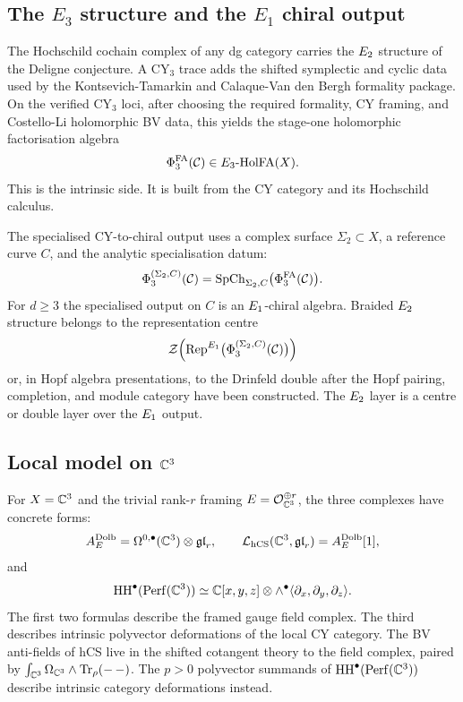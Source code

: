\subsection*{The \(E_3\) structure and the \(E_1\) chiral output}

The Hochschild cochain complex of any dg category carries the
\(E_2\) structure of the Deligne conjecture. A CY$_3$ trace adds the
shifted symplectic and cyclic data used by the Kontsevich-Tamarkin and
Calaque-Van den Bergh formality package. On the verified CY$_3$ loci,
after choosing the required formality, CY framing, and Costello-Li
holomorphic BV data, this yields the stage-one holomorphic
factorisation algebra
\[
  \Phi^{\mathrm{FA}}_3(\mathcal{C})\in E_3\text{-}\mathrm{HolFA}(X).
\]
This is the intrinsic side. It is built from the CY category and its
Hochschild calculus.

The specialised CY-to-chiral output uses a complex surface
\(\Sigma_2\subset X\), a reference curve \(C\), and the analytic
specialisation datum:
\[
  \Phi_3^{(\Sigma_2,C)}(\mathcal{C})
  =
  \operatorname{SpCh}_{\Sigma_2,C}\bigl(\Phi^{\mathrm{FA}}_3(\mathcal{C})\bigr).
\]
For \(d\geq 3\) the specialised output on \(C\) is an \(E_1\)-chiral
algebra. Braided \(E_2\) structure belongs to the representation
centre
\[
  \mathcal{Z}\!\left(\operatorname{Rep}^{E_1}
  \bigl(\Phi_3^{(\Sigma_2,C)}(\mathcal{C})\bigr)\right)
\]
or, in Hopf algebra presentations, to the Drinfeld double after the
Hopf pairing, completion, and module category have been constructed.
The \(E_2\) layer is a centre or double layer over the \(E_1\)
output.

\subsection*{Local model on \(\mathbb{C}^3\)}

For \(X=\mathbb{C}^3\) and the trivial rank-\(r\) framing \(E=\mathcal{O}_{\mathbb{C}^3}^{\oplus r}\),
the three complexes have concrete forms:
\[
  A_E^{\mathrm{Dolb}}
  =
  \Omega^{0,\bullet}(\mathbb{C}^3)\otimes\mathfrak{gl}_r,
  \qquad
  \mathcal{L}_{\mathrm{hCS}}(\mathbb{C}^3,\mathfrak{gl}_r)
  =
  A_E^{\mathrm{Dolb}}[1],
\]
and
\[
  \operatorname{HH}^\bullet(\mathrm{Perf}(\mathbb{C}^3))
  \simeq
  \mathbb{C}[x,y,z]\otimes
  \wedge^\bullet
  \langle \partial_x,\partial_y,\partial_z\rangle .
\]
The first two formulas describe the framed gauge field complex. The
third describes intrinsic polyvector deformations of the local CY
category. The BV anti-fields of hCS live in the shifted cotangent
theory to the field complex, paired by
\(\int_{\mathbb{C}^3}\Omega_{\mathbb{C}^3}\wedge\operatorname{Tr}_\rho(-\, -)\). The
\(p>0\) polyvector summands of \(\operatorname{HH}^\bullet(\mathrm{Perf}(\mathbb{C}^3))\) describe
intrinsic category deformations instead.

